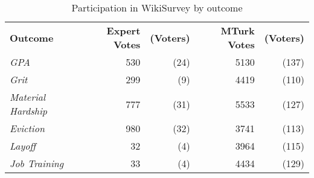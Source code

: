 \begin{table}[h]
\centering
\caption{Participation in WikiSurvey by outcome}
\label{wikisurvey}
\begin{tabular}{lrrrr}
\toprule
\textbf{Outcome}           & \textbf{Expert Votes} & \textbf{(Voters)} & \textbf{MTurk Votes} & \textbf{(Voters)} \\
\textit{GPA}               & 530                   & (24)              & 5130                 & (137)             \\
\textit{Grit}              & 299                   &  (9)              & 4419                 & (110)             \\
\textit{Material Hardship} & 777                   & (31)              & 5533                 & (127)             \\
\textit{Eviction}          & 980                   & (32)              & 3741                 & (113)             \\
\textit{Layoff}            & 32                    &  (4)              & 3964                 & (115)             \\
\textit{Job Training}      & 33                    &  (4)              & 4434                 & (129)             \\
\bottomrule
\end{tabular}
\end{table}
